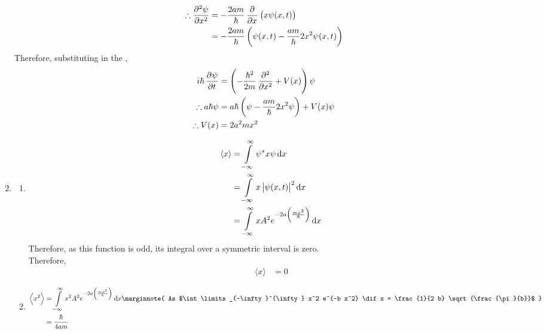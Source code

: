 \documentclass[titlepage, fleqn, a4paper, 12pt, twoside]{article}
\theoremstyle{definition}
\theoremstyle{theorem}
\begin{document}
\begin{solution}
\begin{enumerate}[leftmargin=*]
\begin{align*}
				\therefore \dpd[2]{\psi}{x} & = -\frac{2 a m}{\hbar} \dpd{}{x}\left( x \psi(x,t) \right) \\
                                                            & = -\frac{2 a m}{\hbar} \left( \psi(x,t) - \frac{a m}{\hbar} 2 x^2 \psi(x,t) \right)
			\end{align*}
			Therefore, substituting in the ,
			\begin{align*}
				i \hbar \dpd{\psi}{t}   & = \left( -\frac{\hbar^2}{2 m} \dpd[2]{}{x} + V(x) \right) \psi           \\
				\therefore a \hbar \psi & = a \hbar \left( \psi - \frac{a m}{\hbar} 2 x^2 \psi \right) + V(x) \psi \\
				\therefore V(x)         & = 2 a^2 m x^2
			\end{align*}
		\item
			\begin{enumerate}[leftmargin=*]
				\item
					\begin{align*}
						\langle x \rangle & = \int\limits_{-\infty}^{\infty} \psi^* x \psi \dif x                \\
                                                                  & = \int\limits_{-\infty}^{\infty} x \left| \psi(x,t) \right|^2 \dif x \\
                                                                  & = \int\limits_{-\infty}^{\infty} x A^2 e^{-2 a \left( \frac{m x^2}{\hbar} \right)} \dif x
					\end{align*}
					Therefore, as this function is odd, its integral over a symmetric interval is zero.\\
					Therefore,
					\begin{align*}
						\langle x \rangle & = 0
					\end{align*}
				\item
					\begin{align*}
						\left\langle x^2 \right\rangle                                    & = \int\limits_{-\infty}^{\infty} x^2 A^2 e^{-2 a \left( \frac{m x^2}{\hbar} \right)} \dif x
						\marginnote
						{
							As $\int\limits_{-\infty}^{\infty} x^2 e^{-b x^2} \dif x  = \frac{1}{2 b} \sqrt{\frac{\pi}{b}}$
						}                                                                \\
                                                                                                                  & = \frac{\hbar}{4 a m}
					\end{align*}

\end{enumerate}
\end{enumerate}
\end{solution}
\end{document}
